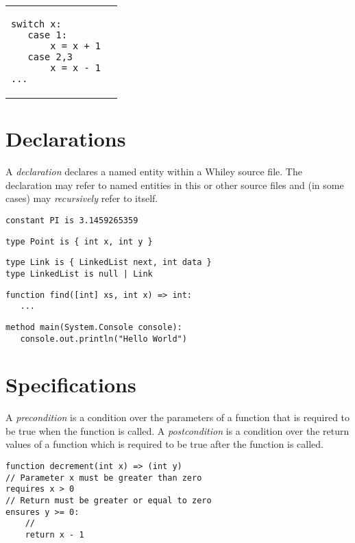 \documentclass[a4paper,10pt,twcolumn]{article}
\begin{document}
\begin{tabular}{lr}
\begin{minipage}[t]{3.75cm}
\begin{lstlisting}
switch x:
   case 1:
       x = x + 1
   case 2,3
       x = x - 1
...
\end{lstlisting}
\end{minipage}\\


\end{tabular}
\newpage
\section*{Declarations}
A {\em declaration} declares a named entity within a Whiley source file.  The declaration may refer to named entities in this or other source files and (in some cases) may {\em recursively} refer to itself.

\begin{lstlisting}
constant PI is 3.1459265359
\end{lstlisting}

\begin{lstlisting}
type Point is { int x, int y }
\end{lstlisting}

\begin{lstlisting}
type Link is { LinkedList next, int data }
type LinkedList is null | Link
\end{lstlisting}

\begin{lstlisting}
function find([int] xs, int x) => int:
   ...
\end{lstlisting}

\begin{lstlisting}
method main(System.Console console):
   console.out.println("Hello World")
\end{lstlisting}

\section*{Specifications}

A {\em precondition} is a condition over the parameters of a function
that is required to be true when the function is called.  A {\em
  postcondition} is a condition over the return values of a function
which is required to be true after the function is called.

\begin{lstlisting}
function decrement(int x) => (int y) 
// Parameter x must be greater than zero
requires x > 0
// Return must be greater or equal to zero
ensures y >= 0:
    //
    return x - 1
\end{lstlisting}
\end{document}
